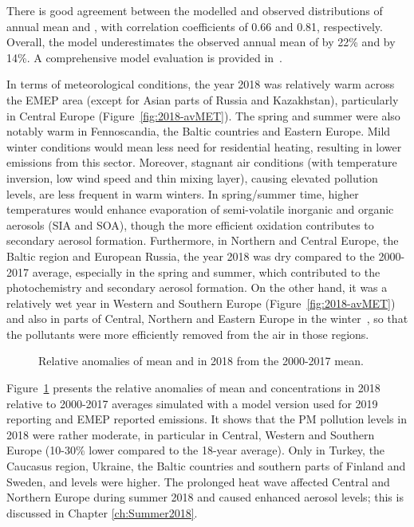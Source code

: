 There is good agreement between the modelled and observed
distributions of annual mean \PM[10] and \PM[2.5], with correlation
coefficients of 0.66 and 0.81, respectively. Overall, the model
underestimates the observed annual mean of \PM[10] by 22\% and
\PM[2.5] by 14\%. A comprehensive model evaluation is provided in~\cite{WEB2020:PM}.

In terms of meteorological conditions, the year 2018 was relatively warm across the EMEP area (except for Asian parts of Russia and Kazakhstan), particularly in Central Europe  (Figure~\ref{fig:2018-avMET}). The spring and summer were also notably warm in Fennoscandia, the Baltic countries and Eastern Europe. Mild winter conditions would mean less need for residential heating, resulting in lower emissions from this sector. Moreover, stagnant air conditions (with temperature inversion, low wind speed and thin mixing layer), causing elevated pollution levels, are less frequent in warm winters. In spring/summer time, higher temperatures would enhance evaporation of semi-volatile inorganic and organic aerosols (SIA and SOA), though the more efficient oxidation contributes to secondary aerosol formation. Furthermore, in Northern and Central Europe, the Baltic region and European Russia, the year 2018 was dry compared to the 2000-2017 average, especially in the spring and summer, which contributed to the photochemistry and secondary aerosol formation. On the other hand, it was a relatively wet year in Western and Southern Europe (Figure~\ref{fig:2018-avMET}) and also in parts of Central, Northern and Eastern Europe in the winter~\citep{CAMS2019}, so that the pollutants were more efficiently removed from the air in those regions.  

\begin{figure}[H]
\caption{Relative anomalies of mean \PM[10] and \PM[2.5] in 2018 from the 2000-2017 mean.}
\label{fig:PManomin2018}
\end{figure}

Figure~\ref{fig:PManomin2018} presents the relative anomalies of mean \PM[10] and \PM[2.5] concentrations in 2018 relative to 2000-2017 averages simulated with a model version used for 2019 reporting and EMEP reported emissions. It shows that the PM pollution levels in 2018 were rather moderate, in particular in Central, Western and Southern Europe (10-30\% lower compared to the 18-year average). Only in Turkey, the Caucasus region, Ukraine, the Baltic countries and southern parts of Finland and Sweden, \PM[10] and \PM[2.5] levels were higher. The prolonged heat wave affected Central and Northern Europe during summer 2018 and caused enhanced aerosol levels; this is discussed in Chapter \ref{ch:Summer2018}.


